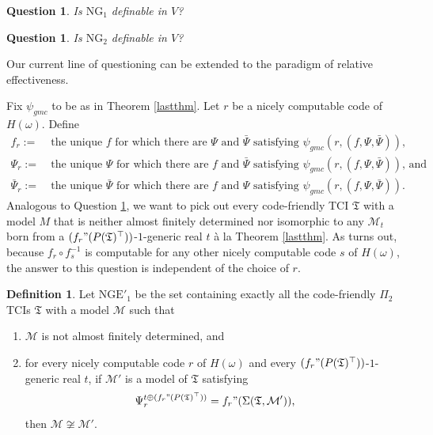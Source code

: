 \documentclass[12pt, twoside]{memoir}
\numberwithin{equation}{section}
\newtheorem{ques}[thm]{Question}
\theoremstyle{definition}
\newtheorem{defi}[thm]{Definition}
\theoremstyle{remark}
\theoremstyle{definition}
\theoremstyle{definition}
\theoremstyle{definition}
\theoremstyle{remark}
\begin{document}
\begin{ques}\label{q548}
Is $\mathrm{NG}_1$ definable in $V$?
\end{ques}

\begin{ques}\label{q552}
Is $\mathrm{NG}_2$ definable in $V$?
\end{ques}

Our current line of questioning can be extended to the paradigm of relative effectiveness.

Fix $\psi_{gmc}$ to be as in Theorem \ref{lastthm}. Let $r$ be a nicely computable code of $H(\omega)$. Define
\begin{align*}
    f_r := \ & \text{the unique } f \text{ for which there are } \Psi \text{ and } \bar{\Psi} \text{ satisfying } \psi_{gmc}(r, (f, \Psi, \bar{\Psi})) \text{,} \\
    \Psi_r := \ & \text{the unique } \Psi \text{ for which there are } f \text{ and } \bar{\Psi} \text{ satisfying } \psi_{gmc}(r, (f, \Psi, \bar{\Psi})) \text{, and} \\
    \bar{\Psi}_r := \ & \text{the unique } \bar{\Psi} \text{ for which there are } f \text{ and } \Psi \text{ satisfying } \psi_{gmc}(r, (f, \Psi, \bar{\Psi})) \text{.}
\end{align*}
Analogous to Question \ref{q548}, we want to pick out every code-friendly TCI $\mathfrak{T}$ with a model $M$ that is neither almost finitely determined nor isomorphic to any $\mathcal{M}_t$ born from a $(f_r" (P(\mathfrak{T})^{\top}))$-$1$-generic real $t$ \`{a} la Theorem \ref{lastthm}. As turns out, because $f_r \circ f_s^{-1}$ is computable for any other nicely computable code $s$ of $H(\omega)$, the answer to this question is independent of
the choice of $r$.

\begin{defi}
Let $\mathrm{NGE}'_1$ be the set containing exactly all the code-friendly $\Pi_2$ TCIs $\mathfrak{T}$ with a model $\mathcal{M}$ such that
\begin{enumerate}[label=(\alph*)]
    \item $\mathcal{M}$ is not almost finitely determined, and
    \item for every nicely computable code $r$ of $H(\omega)$ and every $(f_r" (P(\mathfrak{T})^{\top}))$-$1$-generic real $t$, if $\mathcal{M}'$ is a model of $\mathfrak{T}$ satisfying 
    \begin{equation*}
        \Psi_r^{t \oplus (f_r" (P(\mathfrak{T})^{\top}))} = f_r" (\Sigma(\mathfrak{T}, \mathcal{M}')) \text{,}
    \end{equation*}
    then $\mathcal{M} \not \cong \mathcal{M}'$.
\end{enumerate}
\end{defi}
\end{document}
